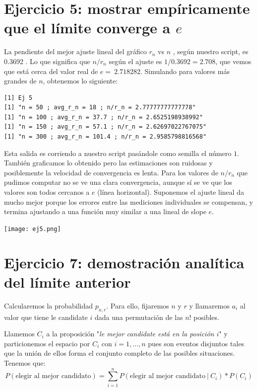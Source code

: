 \documentclass[a4paper]{article}
\begin{document}
\section*{Ejercicio 5: mostrar empíricamente que el límite converge a $e$}
La pendiente del mejor ajuste lineal del gráfico $r_n$ vs $n$ , según nuestro script, es 0.3692 . Lo que significa que $n/r_n$ según el ajuste es $1/0.3692 = 2.708$, que vemos que está cerca del valor real de $e =~ 2.718282 $. Simulando para valores más grandes de $n$, obtenemos lo siguiente:
\\
\begin{verbatim}
[1] Ej 5
[1] "n = 50 ; avg_r_n = 18 ; n/r_n = 2.77777777777778"
[1] "n = 100 ; avg_r_n = 37.7 ; n/r_n = 2.6525198938992"
[1] "n = 150 ; avg_r_n = 57.1 ; n/r_n = 2.62697022767075"
[1] "n = 300 ; avg_r_n = 101.4 ; n/r_n = 2.9585798816568"
\end{verbatim}

Esta salida es corriendo a nuestro script pasándole como semilla el número $1$.
\\

También graficamos lo obtenido pero las estimaciones son ruidosas y posiblemente la velocidad de convergencia es lenta. Para los valores de $n/r_n$ que pudimos computar no se ve una clara convergencia, aunque sí se ve que los valores son todos cercanos a $e$ (línea horizontal). Suponemos el ajuste lineal da mucho mejor porque los errores entre las mediciones individuales se compensan, y termina ajustando a una función muy similar a una lineal de slope $e$.

\texttt{[image: ej5.png]}

\section*{Ejercicio 7: demostración analítica del límite anterior}

Calcularemos la probabilidad $p_{n,r}$. Para ello, fijaremos $n$ y $r$ y llamaremos $a_i$ al valor que tiene le candidate $i$ dada una permutación de las $n!$ posibles.

Llamemos $C_i$ a la proposición "\textit{le mejor candidate está en la posición $i$}" y particionemos el espacio por $C_i$ con $i=1,\ldots,n$ pues son eventos disjuntos tales que la unión de ellos forma el conjunto completo de las posibles situaciones. Tenemos que:\\

$$P(\text{elegir al mejor candidato}) = \sum_{i=1}^{n}P(\text{elegir al mejor candidato} \ | \ C_i)*P(C_i)$$
\end{document}
